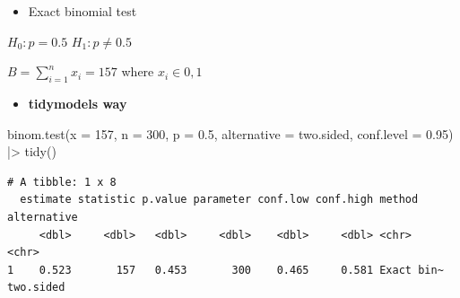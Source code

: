 \documentclass[
  ignorenonframetext,
]{beamer}
\newenvironment{Shaded}{\begin{snugshade}}{\end{snugshade}}
\newcommand{\AttributeTok}[1]{\textcolor[rgb]{0.40,0.45,0.13}{#1}}
\newcommand{\DecValTok}[1]{\textcolor[rgb]{0.68,0.00,0.00}{#1}}
\newcommand{\FloatTok}[1]{\textcolor[rgb]{0.68,0.00,0.00}{#1}}
\newcommand{\FunctionTok}[1]{\textcolor[rgb]{0.28,0.35,0.67}{#1}}
\newcommand{\NormalTok}[1]{\textcolor[rgb]{0.00,0.23,0.31}{#1}}
\newcommand{\SpecialCharTok}[1]{\textcolor[rgb]{0.37,0.37,0.37}{#1}}
\newcommand{\StringTok}[1]{\textcolor[rgb]{0.13,0.47,0.30}{#1}}
\providecommand{\tightlist}{%
  \setlength{\itemsep}{0pt}\setlength{\parskip}{0pt}}\usepackage{longtable,booktabs,array}
\begin{document}
\begin{frame}[fragile]{}
\label{section-13}
\begin{itemize}
\tightlist
\item
  Exact binomial test
\end{itemize}

\(H_0: p = 0.5\) \(H_1: p \neq 0.5\)

\(B = \sum_{i=1}^n x_i = 157\) where \(x_i \in {0,1}\)

\begin{itemize}
\tightlist
\item
  \textbf{tidymodels way}
\end{itemize}

\tiny

\begin{Shaded}
\begin{Highlighting}[]
\FunctionTok{binom.test}\NormalTok{(}\AttributeTok{x =} \DecValTok{157}\NormalTok{, }\AttributeTok{n =} \DecValTok{300}\NormalTok{, }\AttributeTok{p =} \FloatTok{0.5}\NormalTok{, }
           \AttributeTok{alternative =} \StringTok{\textquotesingle{}two.sided\textquotesingle{}}\NormalTok{,}
           \AttributeTok{conf.level =} \FloatTok{0.95}\NormalTok{) }\SpecialCharTok{|\textgreater{}} 
  \FunctionTok{tidy}\NormalTok{()}
\end{Highlighting}
\end{Shaded}

\begin{verbatim}
# A tibble: 1 x 8
  estimate statistic p.value parameter conf.low conf.high method     alternative
     <dbl>     <dbl>   <dbl>     <dbl>    <dbl>     <dbl> <chr>      <chr>      
1    0.523       157   0.453       300    0.465     0.581 Exact bin~ two.sided  
\end{verbatim}
\end{frame}
\end{document}
